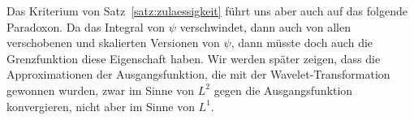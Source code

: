 Das Kriterium von Satz~\ref{satz:zulaessigkeit} führt uns aber auch auf
das folgende Paradoxon. 
Da das Integral von $\psi$ verschwindet, dann auch von allen verschobenen
und skalierten Versionen von $\psi$, dann müsste doch auch die Grenzfunktion
diese Eigenschaft haben.
Wir werden später zeigen, dass die Approximationen der Ausgangsfunktion,
die mit der Wavelet-Transformation gewonnen wurden, zwar im Sinne von $L^2$
gegen die Ausgangsfunktion konvergieren, nicht aber im Sinne von $L^1$.



